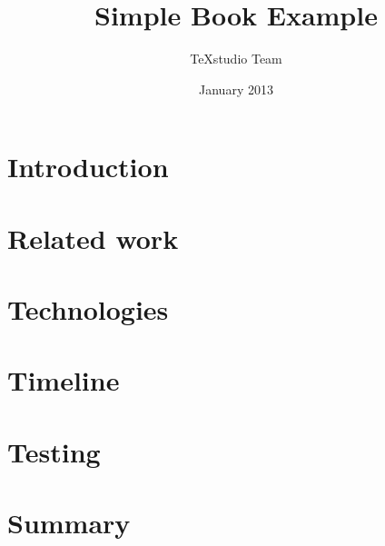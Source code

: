 \documentclass{report}
\begin{document}
	
	\author{TeXstudio Team}
	\title{Simple Book Example}
	\date{January 2013}
	
	
	\maketitle
	\tableofcontents
	
%	
%	
%

	\chapter{Introduction}
	
	
	\chapter{Related work}
	
	
	\chapter{Technologies}
	
	
	\chapter{Timeline}
	
	
	\chapter{Testing}
	
	
	\chapter{Summary}
	
	
	
\end{document}
